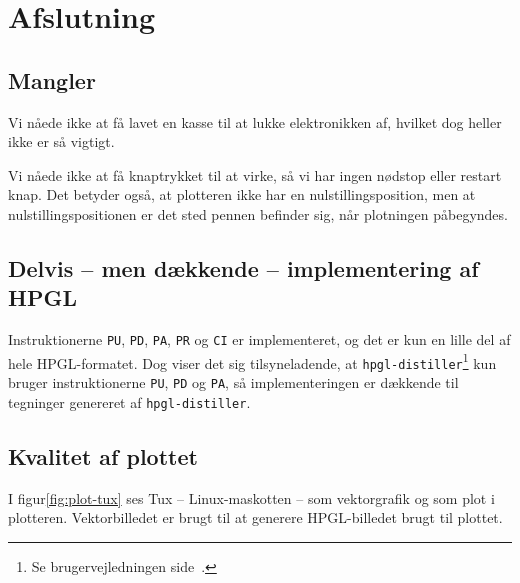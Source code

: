 \chapter{Afslutning}
\label{ch:afslutning}




\section{Mangler}

Vi nåede ikke at få lavet en kasse til at lukke elektronikken af,
hvilket dog heller ikke er så vigtigt.

Vi nåede ikke at få knaptrykket til at virke, så vi har ingen nødstop
eller restart knap. Det betyder også, at plotteren ikke har en
nulstillingsposition, men at nulstillingspositionen er det sted pennen
befinder sig, når plotningen påbegyndes.


\section{Delvis -- men dækkende -- implementering af HPGL}

Instruktionerne \texttt{PU}, \texttt{PD}, \texttt{PA}, \texttt{PR} og
\texttt{CI} er implementeret, og det er kun en lille del af hele
HPGL-formatet. Dog viser det sig tilsyneladende, at
\texttt{hpgl-distiller}\footnote{Se brugervejledningen
  side~\pageref{ch:brugervejledning}.} kun bruger instruktionerne
\texttt{PU}, \texttt{PD} og \texttt{PA}, så implementeringen er
dækkende til tegninger genereret af \texttt{hpgl-distiller}.


\section{Kvalitet af plottet}

I figur\vref{fig:plot-tux} ses Tux -- Linux-maskotten -- som
vektorgrafik og som plot i plotteren. Vektorbilledet er brugt til at
generere HPGL-billedet brugt til plottet. 


